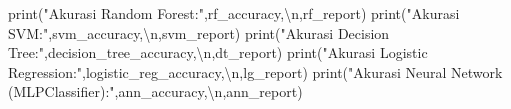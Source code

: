 \documentclass[
  letterpaper,
]{krantz}
\makeatletter
\newenvironment{Shaded}{\begin{snugshade}}{\end{snugshade}}
\newcommand{\BuiltInTok}[1]{\textcolor[rgb]{0.00,0.23,0.31}{#1}}
\newcommand{\CharTok}[1]{\textcolor[rgb]{0.13,0.47,0.30}{#1}}
\newcommand{\NormalTok}[1]{\textcolor[rgb]{0.00,0.23,0.31}{#1}}
\newcommand{\StringTok}[1]{\textcolor[rgb]{0.13,0.47,0.30}{#1}}
\newenvironment{kframe}{%
\medskip{}
\setlength{\fboxsep}{.8em}
 \def\at@end@of@kframe{}%
 \ifinner\ifhmode%
  \def\at@end@of@kframe{\end{minipage}}%
  \begin{minipage}{\columnwidth}%
 \fi\fi%
 \def\FrameCommand##1{\hskip\@totalleftmargin \hskip-\fboxsep
 \colorbox{shadecolor}{##1}\hskip-\fboxsep
     \hskip-\linewidth \hskip-\@totalleftmargin \hskip\columnwidth}%
 \MakeFramed {\advance\hsize-\width
   \@totalleftmargin\z@ \linewidth\hsize
   \@setminipage}}%
 {\par\unskip\endMakeFramed%
 \at@end@of@kframe}
\renewenvironment{Shaded}{\begin{kframe}}{\end{kframe}}
\makeatother
\begin{document}
\begin{Shaded}
\begin{Highlighting}[]
\BuiltInTok{print}\NormalTok{(}\StringTok{"Akurasi Random Forest:"}\NormalTok{,rf\_accuracy,}\StringTok{\textquotesingle{}}\CharTok{\textbackslash{}n}\StringTok{\textquotesingle{}}\NormalTok{,rf\_report)}
\BuiltInTok{print}\NormalTok{(}\StringTok{"Akurasi SVM:"}\NormalTok{,svm\_accuracy,}\StringTok{\textquotesingle{}}\CharTok{\textbackslash{}n}\StringTok{\textquotesingle{}}\NormalTok{,svm\_report)}
\BuiltInTok{print}\NormalTok{(}\StringTok{"Akurasi Decision Tree:"}\NormalTok{,decision\_tree\_accuracy,}\StringTok{\textquotesingle{}}\CharTok{\textbackslash{}n}\StringTok{\textquotesingle{}}\NormalTok{,dt\_report)}
\BuiltInTok{print}\NormalTok{(}\StringTok{"Akurasi Logistic Regression:"}\NormalTok{,logistic\_reg\_accuracy,}\StringTok{\textquotesingle{}}\CharTok{\textbackslash{}n}\StringTok{\textquotesingle{}}\NormalTok{,lg\_report)}
\BuiltInTok{print}\NormalTok{(}\StringTok{"Akurasi Neural Network (MLPClassifier):"}\NormalTok{,ann\_accuracy,}\StringTok{\textquotesingle{}}\CharTok{\textbackslash{}n}\StringTok{\textquotesingle{}}\NormalTok{,ann\_report)}

\end{Highlighting}
\end{Shaded}
\end{document}
